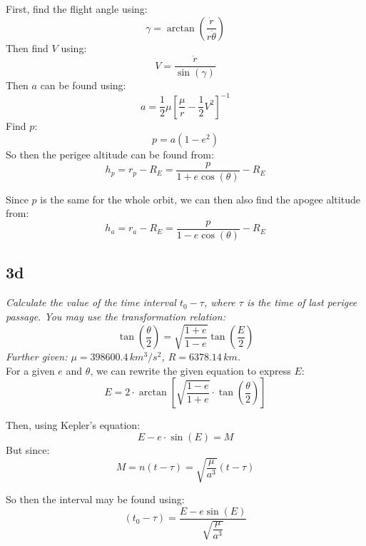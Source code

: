 First, find the flight angle using:
\begin{equation}
    \gamma =\arctan \left( \dfrac {\dot{r}}{r\dot{\theta} }\right)
\end{equation}
Then find $V$ using:
\begin{equation}
    V =\dfrac {\dot{r}}{\sin \left( \gamma \right) }
\end{equation}
Then $a$ can be found using:
\begin{equation}
    a=\dfrac {1}{2}\mu \left[ \dfrac {\mu }{r}-\dfrac {1}{2}V^{2}\right] ^{-1}
\end{equation}
Find $p$:
\begin{equation}
    p = a(1-e^2)
\end{equation}
So then the perigee altitude can be found from:
\begin{equation}
    h_p = r_p-R_E = \frac{p}{1+e \cos(\theta)}-R_E
\end{equation}

Since $p$ is the same for the whole orbit, we can then also find the apogee altitude from:
\begin{equation}
    h_a = r_a-R_E = \frac{p}{1-e \cos(\theta)}-R_E
\end{equation}

\subsection{3d}
\textit{Calculate the value of the time interval $t_0 - \tau$, where $\tau$ is the time of last perigee passage. You may use the transformation relation:} 
\begin{equation}
    \tan \left( \dfrac {\theta }{2}\right) =\sqrt {\dfrac {1+e}{1-e}}\tan \left( \dfrac {E}{2}\right) 
\end{equation}
\textit{Further given: $\mu = 398600.4 \, km^3/s^2$, $R=6378.14 \, km$.} \\

For a given $e$ and $\theta$, we can rewrite the given equation to express $E$:
\begin{equation}
    E=2\cdot \arctan \left[ \sqrt {\dfrac {1-e}{1+e}}\cdot \tan \left( \dfrac {\theta }{2}\right) \right] 
\end{equation}

Then, using Kepler's equation:
\begin{equation}
    E-e\cdot \sin \left( E\right) = M
\end{equation}
But since:
\begin{equation}
    M=n\left( t-\tau \right) =\sqrt {\dfrac {\mu }{a^{3}}}\left( t-\tau \right) 
\end{equation}

So then the interval may be found using:
\begin{equation}
    \left( t_{0}-\tau \right) =\dfrac {E-e\sin \left( E\right) }{\sqrt {\dfrac {\mu }{a^{3}}}}
\end{equation}